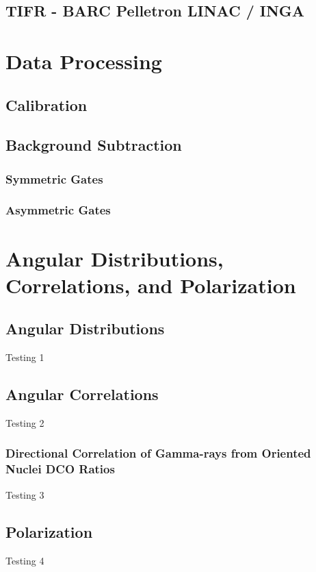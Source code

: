 \subsection{TIFR - BARC Pelletron LINAC / INGA}
\label{ssec:exp-pr-details-inga}

\section{Data Processing}
\label{sec:exp-pr-data-proc}
\subsection{Calibration}
\label{ssec:exp-pr-data-proc-cal}
\subsection{Background Subtraction}
\label{ssec:exp-pr-data-proc-bg-sub}
\subsubsection{Symmetric Gates}
\label{sssec:exp-pr-data-proc-bg-sub-sym}
\subsubsection{Asymmetric Gates}
\label{sssec:exp-pr-data-proc-bg-sub-asym}

\section{Angular Distributions, Correlations, and Polarization}
\label{sec:exp-pr-data-ang}
\subsection{Angular Distributions}
\label{ssec:exp-pr-data-ang-dist}
Testing 1
\subsection{Angular Correlations}
\label{ssec:exp-pr-data-ang-cor}
Testing 2
\subsubsection{Directional Correlation of Gamma-rays from Oriented Nuclei DCO Ratios}
\label{sssec:exp-pr-data-ang-cor-dco}
Testing 3
\subsection{Polarization}
\label{ssec:exp-pr-data-ang-pol}
Testing 4
